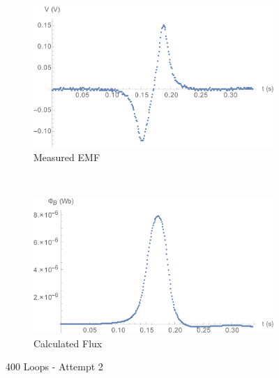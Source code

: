\documentclass[a4paper]{scrartcl}
\begin{document}
\begin{figure}[p]
    \centering
    \begin{subfigure}[b]{0.45\textwidth}
        \includegraphics[width = \textwidth]{400_2_voltage.png}
        \caption{Measured EMF}
    \end{subfigure}
    ~
    \begin{subfigure}[b]{0.45\textwidth}
        \includegraphics[width = \textwidth]{400_2_flux.png}
        \caption{Calculated Flux}
    \end{subfigure}
    \caption{400 Loops - Attempt 2}
    \label{fig:400_2}
\end{figure}
\end{document}

